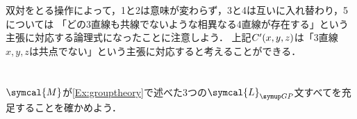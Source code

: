 双対をとる操作によって，1と2は意味が変わらず，3と4は互いに入れ替わり，5については
「どの3直線も共線でないような相異なる4直線が存在する」という主張に対応する論理式になったことに注意しよう．
上記\(\apply{C'}{x, y, z}\)は「3直線\(x, y, z\)は共点でない」という主張に対応すると考えることができる．

\section*{}

\subsection*{}

\(\symcal{M}\)が\cref{Ex:grouptheory}で述べた3つの\(\symcal{L}_{\GP}\)文すべてを充足することを確かめよう．

